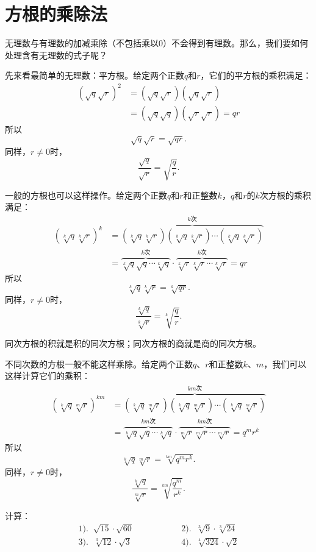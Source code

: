 \documentclass[12pt,UTF8]{ctexbook}
\begin{document}
\section{方根的乘除法}

无理数与有理数的加减乘除（不包括乘以$0$）不会得到有理数。那么，我们要如何处理含有无理数的式子呢？

先来看最简单的无理数：平方根。给定两个正数$q$和$r$，它们的平方根的乘积满足：
\begin{align*}
    \left(\sqrt{q}\sqrt{r}\right)^2 &=  \left(\sqrt{q}\sqrt{r}\right)\left(\sqrt{q}\sqrt{r}\right)  \\
    &= \left(\sqrt{q}\sqrt{q}\right)\left(\sqrt{r}\sqrt{r}\right) = qr  
\end{align*}
所以
$$\sqrt{q}\sqrt{r} = \sqrt{qr}.$$
同样，$r \neq 0$时，
$$\frac{\sqrt{q}}{\sqrt{r}} = \sqrt{\frac{q}{r}}.$$

一般的方根也可以这样操作。给定两个正数$q$和$r$和正整数$k$，$q$和$r$的$k$次方根的乘积满足：
\begin{align*}
    \left(\sqrt[k]{q}\sqrt[k]{r}\right)^k &= \overbrace{\left(\sqrt[k]{q}\sqrt[k]{r}\right)\left(\sqrt[k]{q}\sqrt[k]{r}\right) \cdots \left(\sqrt[k]{q}\sqrt[k]{r}\right)}^{k\mbox{次}}   \\
    &= \overbrace{\sqrt[k]{q}\sqrt{q}\cdots \sqrt[k]{q}}^{k\mbox{次}}\cdot\overbrace{\sqrt[k]{r}\sqrt[k]{r}\cdots \sqrt[k]{r}}^{k\mbox{次}} = qr  
\end{align*}
所以
$$\sqrt[k]{q}\sqrt[k]{r} = \sqrt[k]{qr}.$$
同样，$r \neq 0$时，
$$\frac{\sqrt[k]{q}}{\sqrt[k]{r}} = \sqrt[k]{\frac{q}{r}}.$$

同次方根的积就是积的同次方根；同次方根的商就是商的同次方根。

不同次数的方根一般不能这样乘除。给定两个正数$q$、$r$和正整数$k$、$m$，我们可以这样计算它们的乘积：
\begin{align*}
    \left(\sqrt[k]{q}\sqrt[m]{r}\right)^{km} &= \overbrace{\left(\sqrt[k]{q}\sqrt[m]{r}\right)\left(\sqrt[k]{q}\sqrt[m]{r}\right) \cdots \left(\sqrt[k]{q}\sqrt[m]{r}\right)}^{km\mbox{次}}   \\
    &= \overbrace{\sqrt[k]{q}\sqrt{q}\cdots \sqrt[k]{q}}^{km\mbox{次}}\cdot\overbrace{\sqrt[m]{r}\sqrt[m]{r}\cdots \sqrt[m]{r}}^{km\mbox{次}} = q^mr^k  
\end{align*}
所以
$$\sqrt[k]{q}\sqrt[m]{r} = \sqrt[km]{q^mr^k}.$$
同样，$r \neq 0$时，
$$\frac{\sqrt[k]{q}}{\sqrt[m]{r}} = \sqrt[km]{\frac{q^m}{r^k}}.$$

\begin{et}
    计算：\\
    $$
    \begin{array}{lll}
       1).\;\; \displaystyle  \sqrt{15}\cdot\sqrt{60} &  \phantom{00000000} & 2).\;\; \displaystyle \sqrt[3]{9}\cdot\sqrt[3]{24} \\[2em]
       3).\;\; \displaystyle \sqrt[3]{12}\cdot\sqrt{3} &  \phantom{00000000} & 4).\;\; \displaystyle \sqrt[4]{324}\cdot\sqrt{2}
    \end{array}
    $$
\end{et}
\end{document}
